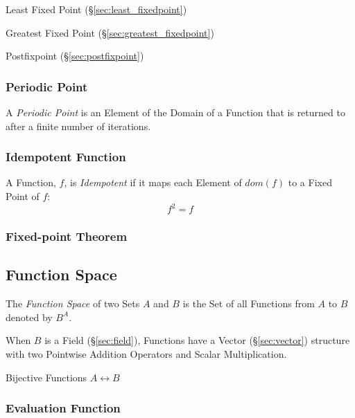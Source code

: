 Least Fixed Point (\S\ref{sec:least_fixedpoint})

Greatest Fixed Point (\S\ref{sec:greatest_fixedpoint})

Postfixpoint (\S\ref{sec:postfixpoint})



\subsubsection{Periodic Point}\label{sec:periodic_point}

A \emph{Periodic Point} is an Element of the Domain of a Function that
is returned to after a finite number of iterations.



\subsubsection{Idempotent Function}\label{sec:idempotent}

A Function, $f$, is \emph{Idempotent} if it maps each Element of
$dom(f)$ to a Fixed Point of $f$:
\[
  f^2 = f
\]



\subsubsection{Fixed-point Theorem}\label{sec:fixedpoint_theorem}



\subsection{Function Space}\label{sec:function_space}

The \emph{Function Space} of two Sets $A$ and $B$ is the Set of all
Functions from $A$ to $B$ denoted by $B^A$.

When $B$ is a Field (\S\ref{sec:field}), Functions have a Vector
(\S\ref{sec:vector}) structure with two Pointwise Addition Operators
and Scalar Multiplication. %

Bijective Functions $A \leftrightarrow B$



\subsubsection{Evaluation Function}\label{sec:evaluation_function}

